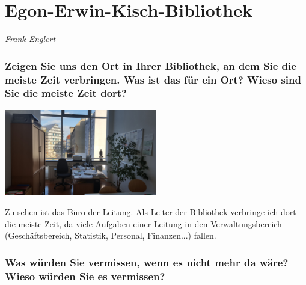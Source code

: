 
\vspace*{.5cm}
\section{Egon-Erwin-Kisch-Bibliothek}
\begin{center}
\emph{Frank Englert}
\end{center}
\vspace*{1cm}


\hypertarget{zeigen-sie-uns-den-ort-in-ihrer-bibliothek-an-dem-sie-die-meiste-zeit-verbringen.-was-ist-das-fuxfcr-ein-ort-wieso-sind-sie-die-meiste-zeit-dort}{%
\subsubsection*{Zeigen Sie uns den Ort in Ihrer Bibliothek, an dem Sie die
meiste Zeit verbringen. Was ist das für ein Ort? Wieso sind Sie die
meiste Zeit
dort?}\label{zeigen-sie-uns-den-ort-in-ihrer-bibliothek-an-dem-sie-die-meiste-zeit-verbringen.-was-ist-das-fuxfcr-ein-ort-wieso-sind-sie-die-meiste-zeit-dort}}

\begin{center}
\includegraphics[width=0.5\textwidth]{kisch/img/buero.jpg}
\end{center}

Zu sehen ist das Büro der Leitung. Als Leiter der Bibliothek verbringe
ich dort die meiste Zeit, da viele Aufgaben einer Leitung in den
Verwaltungsbereich (Geschäftsbereich, Statistik, Personal, Finanzen...)
fallen.

\hypertarget{was-wuxfcrden-sie-vermissen-wenn-es-nicht-mehr-da-wuxe4re-wieso-wuxfcrden-sie-es-vermissen}{%
\subsubsection*{Was würden Sie vermissen, wenn es nicht mehr da wäre? Wieso
würden Sie es
vermissen?}\label{was-wuxfcrden-sie-vermissen-wenn-es-nicht-mehr-da-wuxe4re-wieso-wuxfcrden-sie-es-vermissen}}

